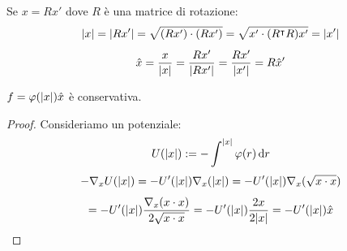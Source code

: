 Se $x= Rx'$ dove $R$ è una matrice di rotazione:
\begin{equation}
    \abs{x}= \abs{Rx'}= \sqrt{(Rx')\cdot(Rx')}= \sqrt{x'\cdot(R^\intercal R)x'}= \abs{x'}
\end{equation}
\begin{equation}
    \hat{x}=\frac{x}{\abs{x}}= \frac{Rx'}{\abs{Rx'}}= \frac{Rx'}{\abs{x'}}=R\hat{x}'
\end{equation}

\begin{proposition}
    $f= \varphi(\abs{x})\hat{x}$ è conservativa.    
\end{proposition}
\begin{proof}
    Consideriamo un potenziale:
    \begin{equation}
        U(\abs{x}):=-\int^\abs{x}\varphi(r)\dd{r}
    \end{equation}
    \begin{equation*}
        -\nabla_x U(\abs{x}) = -U'(\abs{x}) \nabla_x (\abs{x}) = -U'(\abs{x}) \nabla_x (\sqrt{x \cdot x}) 
    \end{equation*}
    \begin{equation*}
        = -U'(\abs{x}) \frac{\nabla_x (x \cdot x)}{2 \sqrt{x \cdot x}} = -U'(\abs{x}) \frac{2x}{2 \abs{x}} = -U'(\abs{x}) \hat{x}
\end{equation*}
\end{proof}

